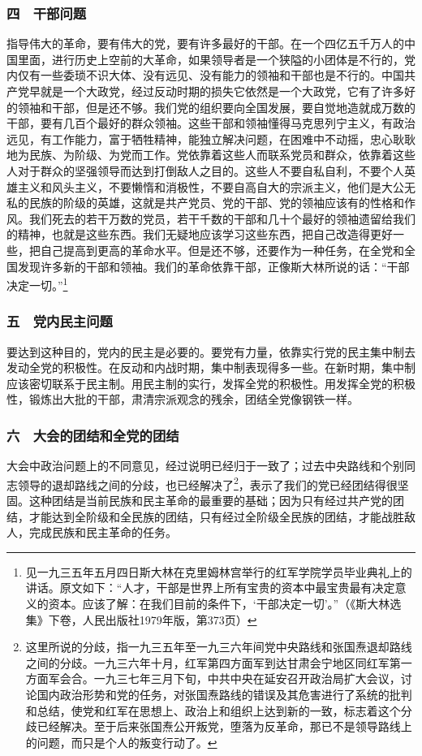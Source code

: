 \documentclass[cn,11pt,chinese]{elegantbook}
\def\myformat#1{\hfil\hfil #1}
\begin{document}
\subsubsection*{\myformat{四　干部问题 }}
指导伟大的革命，要有伟大的党，要有许多最好的干部。在一个四亿五千万人的中国里面，进行历史上空前的大革命，如果领导者是一个狭隘的小团体是不行的，党内仅有一些委琐不识大体、没有远见、没有能力的领袖和干部也是不行的。中国共产党早就是一个大政党，经过反动时期的损失它依然是一个大政党，它有了许多好的领袖和干部，但是还不够。我们党的组织要向全国发展，要自觉地造就成万数的干部，要有几百个最好的群众领袖。这些干部和领袖懂得马克思列宁主义，有政治远见，有工作能力，富于牺牲精神，能独立解决问题，在困难中不动摇，忠心耿耿地为民族、为阶级、为党而工作。党依靠着这些人而联系党员和群众，依靠着这些人对于群众的坚强领导而达到打倒敌人之目的。这些人不要自私自利，不要个人英雄主义和风头主义，不要懒惰和消极性，不要自高自大的宗派主义，他们是大公无私的民族的阶级的英雄，这就是共产党员、党的干部、党的领袖应该有的性格和作风。我们死去的若干万数的党员，若干千数的干部和几十个最好的领袖遗留给我们的精神，也就是这些东西。我们无疑地应该学习这些东西，把自己改造得更好一些，把自己提高到更高的革命水平。但是还不够，还要作为一种任务，在全党和全国发现许多新的干部和领袖。我们的革命依靠干部，正像斯大林所说的话：“干部决定一切。”\footnote[13]{ 见一九三五年五月四日斯大林在克里姆林宫举行的红军学院学员毕业典礼上的讲话。原文如下：“人才，干部是世界上所有宝贵的资本中最宝贵最有决定意义的资本。应该了解：在我们目前的条件下，‘干部决定一切’。”（《斯大林选集》下卷，人民出版社1979年版，第373页）}\\
\subsubsection*{\myformat{五　党内民主问题 }}
要达到这种目的，党内的民主是必要的。要党有力量，依靠实行党的民主集中制去发动全党的积极性。在反动和内战时期，集中制表现得多一些。在新时期，集中制应该密切联系于民主制。用民主制的实行，发挥全党的积极性。用发挥全党的积极性，锻炼出大批的干部，肃清宗派观念的残余，团结全党像钢铁一样。\\
\subsubsection*{\myformat{六　大会的团结和全党的团结 }}
大会中政治问题上的不同意见，经过说明已经归于一致了；过去中央路线和个别同志领导的退却路线之间的分歧，也已经解决了\footnote[14]{ 这里所说的分歧，指一九三五年至一九三六年间党中央路线和张国焘退却路线之间的分歧。一九三六年十月，红军第四方面军到达甘肃会宁地区同红军第一方面军会合。一九三七年三月下旬，中共中央在延安召开政治局扩大会议，讨论国内政治形势和党的任务，对张国焘路线的错误及其危害进行了系统的批判和总结，使党和红军在思想上、政治上和组织上达到新的一致，标志着这个分歧已经解决。至于后来张国焘公开叛党，堕落为反革命，那已不是领导路线上的问题，而只是个人的叛变行动了。 }，表示了我们的党已经团结得很坚固。这种团结是当前民族和民主革命的最重要的基础；因为只有经过共产党的团结，才能达到全阶级和全民族的团结，只有经过全阶级全民族的团结，才能战胜敌人，完成民族和民主革命的任务。\\
\end{document}
